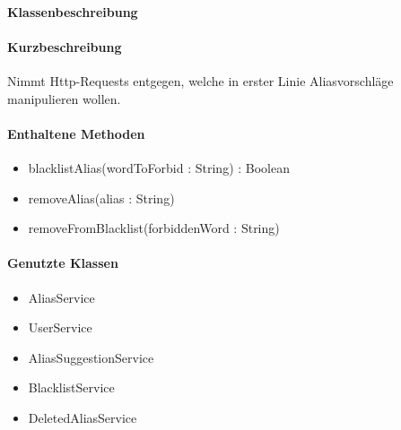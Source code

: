 \paragraph*{Klassenbeschreibung}%
\paragraph*{Kurzbeschreibung}
Nimmt Http-Requests entgegen, welche in erster Linie Aliasvorschläge manipulieren wollen.
\paragraph*{Enthaltene Methoden}
\begin{itemize}
    \item blacklistAlias(wordToForbid : String) : Boolean
    \item removeAlias(alias : String)
    \item removeFromBlacklist(forbiddenWord : String)
\end{itemize}
\paragraph*{Genutzte Klassen}
\begin{itemize}
    \item AliasService
    \item UserService
    \item AliasSuggestionService
    \item BlacklistService
    \item DeletedAliasService
\end{itemize}
